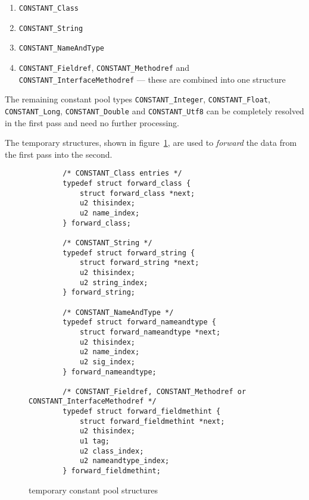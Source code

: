 \begin{enumerate}
 \item \texttt{CONSTANT\_Class}

 \item \texttt{CONSTANT\_String}

 \item \texttt{CONSTANT\_NameAndType}

 \item \texttt{CONSTANT\_Fieldref}, \texttt{CONSTANT\_Methodref} and
 \texttt{CONSTANT\_InterfaceMethodref} --- these are combined into one
 structure
\end{enumerate}

\begingroup
{}
The remaining constant pool types \texttt{CONSTANT\_Integer},
\texttt{CONSTANT\_Float}, \texttt{CONSTANT\_Long},
\texttt{CONSTANT\_Double} and \texttt{CONSTANT\_Utf8} can be
completely resolved in the first pass and need no further processing.

\endgroup

The temporary structures, shown in
figure~\ref{constantpoolstructures}, are used to \textit{forward} the
data from the first pass into the second.

\begin{figure}[h]
\begin{verbatim}
        /* CONSTANT_Class entries */
        typedef struct forward_class {
            struct forward_class *next;
            u2 thisindex;
            u2 name_index;
        } forward_class;

        /* CONSTANT_String */
        typedef struct forward_string {
            struct forward_string *next;
            u2 thisindex;
            u2 string_index;
        } forward_string;

        /* CONSTANT_NameAndType */
        typedef struct forward_nameandtype {
            struct forward_nameandtype *next;
            u2 thisindex;
            u2 name_index;
            u2 sig_index;
        } forward_nameandtype;

        /* CONSTANT_Fieldref, CONSTANT_Methodref or CONSTANT_InterfaceMethodref */
        typedef struct forward_fieldmethint {
            struct forward_fieldmethint *next;
            u2 thisindex;
            u1 tag;
            u2 class_index;
            u2 nameandtype_index;
        } forward_fieldmethint;
\end{verbatim}
\caption{temporary constant pool structures}
\label{constantpoolstructures}
\end{figure}

